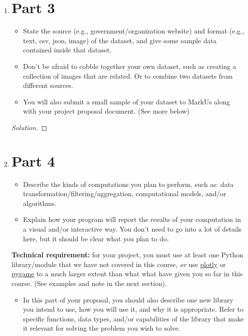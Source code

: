 \documentclass[12pt]{article}
\newenvironment{solution}
  {\renewcommand\qedsymbol{$\blacksquare$}
  \begin{proof}[Solution]}
  {\end{proof}}
\renewcommand\qedsymbol{$\blacksquare$}
\begin{document}
\begin{enumerate}
\newpage

\item \section*{Part 3}

\begin{itemize}
    \item State the source (e.g., government/organization website) and format (e.g., text, csv, json, image) of the dataset, and give some sample data contained inside that dataset.
    \item Don’t be afraid to cobble together your own dataset, such as creating a collection of images that are related. Or to combine two datasets from different sources.
    \item You will also submit a small sample of your dataset to MarkUs along with your project proposal document. (See more below)
\end{itemize}

\begin{solution}

\end{solution}

\newpage

\item \section*{Part 4}

\begin{itemize}
    \item Describe the kinds of computations you plan to perform, such as: data transformation/filtering/aggregation, computational models, and/or algorithms.
    \item Explain how your program will report the results of your computation in a visual and/or interactive way. You don’t need to go into a lot of details here, but it should be clear what you plan to do.
\end{itemize}

\textbf{Technical requirement:} for your project, you must use at least one Python library/module that we have not covered in this course, \emph{or} use \underline{plotly} or \underline{pygame} to a much larger extent than what what have given you so far in this course. (See examples and note in the next section).

\begin{itemize}
    \item In this part of your proposal, you should also describe one new library you intend to use, how you will use it, and why it is appropriate. Refer to specific functions, data types, and/or capabilities of the library that make it relevant for solving the problem you wish to solve.
\end{itemize}


\end{enumerate}
\end{document}
